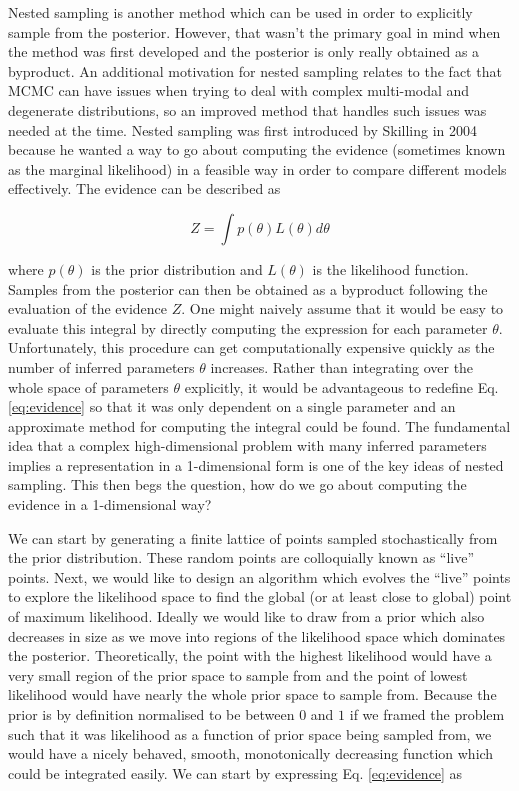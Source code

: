 Nested sampling is another method which can be used in order to explicitly sample from the posterior. However, that wasn't the primary goal in mind when the method was first developed and the posterior is only really obtained as a byproduct. An additional motivation for nested sampling relates to the fact that \ac{MCMC} can have issues when trying to deal with complex multi-modal and degenerate distributions, so an improved method that handles such issues was needed at the time. Nested sampling was first introduced by Skilling in 2004 because he wanted a way to go about computing the evidence (sometimes known as the marginal likelihood) in a feasible way in order to compare different models effectively. The evidence can be described as

\begin{equation}
    Z = \int p(\theta) L(\theta) d\theta \label{eq:evidence}
\end{equation}

where $p(\theta)$ is the prior distribution and $L(\theta)$ is the likelihood function. Samples from the posterior can then be obtained as a byproduct following the evaluation of the evidence $Z$. One might naively assume that it would be easy to evaluate this integral by directly computing the expression for each parameter $\theta$. Unfortunately, this procedure can get computationally expensive quickly as the number of inferred parameters $\theta$ increases. Rather than integrating over the whole space of parameters $\theta$ explicitly, it would be advantageous to redefine Eq. \ref{eq:evidence} so that it was only dependent on a single parameter and an approximate method for computing the integral could be found. The fundamental idea that a complex high-dimensional problem with many inferred parameters implies a representation in a 1-dimensional form is one of the key ideas of nested sampling. This then begs the question, how do we go about computing the evidence in a 1-dimensional way?

We can start by generating a finite lattice of points sampled stochastically from the prior distribution. These random points are colloquially known as ``live'' points. Next, we would like to design an algorithm which evolves the ``live'' points to explore the likelihood space to find the global (or at least close to global) point of maximum likelihood. Ideally we would like to draw from a prior which also decreases in size as we move into regions of the likelihood space which dominates the posterior. Theoretically, the point with the highest likelihood would have a very small region of the prior space to sample from and the point of lowest likelihood would have nearly the whole prior space to sample from. Because the prior is by definition normalised to be between $0$ and $1$ if we framed the problem such that it was likelihood as a function of prior space being sampled from, we would have a nicely behaved, smooth, monotonically decreasing function which could be integrated easily. We can start by expressing Eq. \ref{eq:evidence} as 

